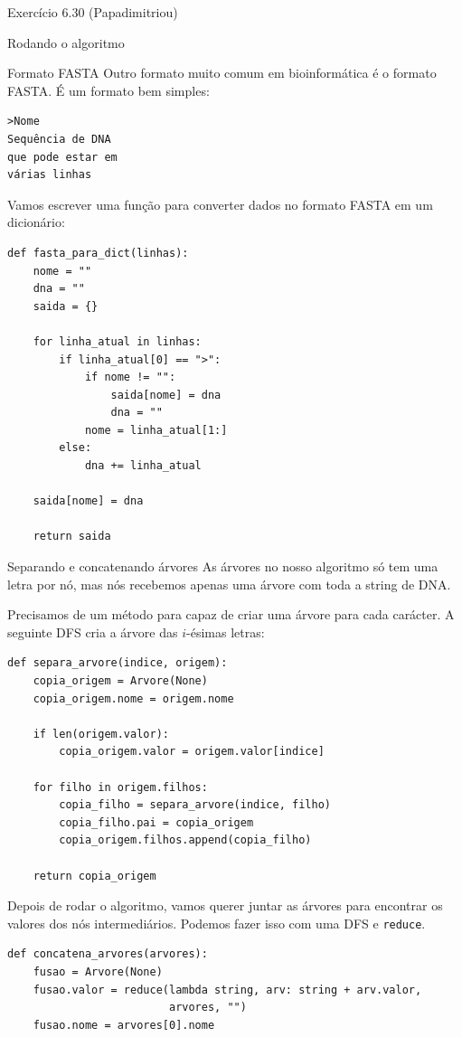 \documentclass[presentation]{beamer}
\begin{document}
\begin{frame}[fragile,label=sec-4]{Exercício 6.30 (Papadimitriou)}
\begin{block}{Rodando o algoritmo}
\begin{block}{Formato FASTA}
Outro formato muito comum em bioinformática é o formato FASTA. É um
formato bem simples:

\begin{verbatim}
>Nome
Sequência de DNA
que pode estar em
várias linhas
\end{verbatim}

Vamos escrever uma função para converter dados no formato FASTA em um
dicionário:
\begin{verbatim}
def fasta_para_dict(linhas):
    nome = ""
    dna = ""
    saida = {}

    for linha_atual in linhas:
        if linha_atual[0] == ">":
            if nome != "":
                saida[nome] = dna
                dna = ""
            nome = linha_atual[1:]
        else:
            dna += linha_atual

    saida[nome] = dna

    return saida
\end{verbatim}
\end{block}

\begin{block}{Separando e concatenando árvores}
As árvores no nosso algoritmo só tem uma letra por nó, mas nós
recebemos apenas uma árvore com toda a string de DNA.

Precisamos de um método para capaz de criar uma árvore para cada
carácter. A seguinte DFS cria a árvore das $i$-ésimas letras:
\begin{verbatim}
def separa_arvore(indice, origem):
    copia_origem = Arvore(None)
    copia_origem.nome = origem.nome

    if len(origem.valor):
        copia_origem.valor = origem.valor[indice]

    for filho in origem.filhos:
        copia_filho = separa_arvore(indice, filho)
        copia_filho.pai = copia_origem
        copia_origem.filhos.append(copia_filho)

    return copia_origem
\end{verbatim}


Depois de rodar o algoritmo, vamos querer juntar as árvores para encontrar
os valores dos nós intermediários. Podemos fazer isso com uma DFS e \verb~reduce~.
\begin{verbatim}
def concatena_arvores(arvores):
    fusao = Arvore(None)
    fusao.valor = reduce(lambda string, arv: string + arv.valor,
                         arvores, "")
    fusao.nome = arvores[0].nome


\end{verbatim}
\end{block}
\end{block}
\end{frame}
\end{document}

